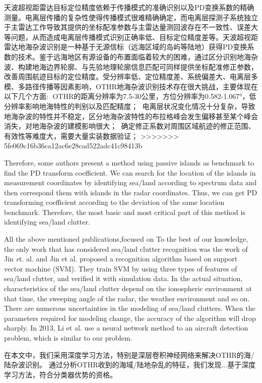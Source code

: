 天波超视距雷达目标定位精度依赖于传播模式的准确识别以及PD变换系数的精确测量。电离层传播的复杂性使得传播模式很难精确确定，而电离层探测子系统独立于主雷达工作导致其提供的坐标配准参数与主雷达量测回波存在不一致性、误差大等问题，从而造成电离层传播模式识别正确率低、目标定位精度差等。天波超视距雷达地海杂波识别是一种基于无源信标（远海区域的岛屿等陆地）获得PD变换系数的技术。鉴于远海地区有源设备的布置面临着较大的困难，通过区分识别地海杂波、构建地海边界轮廓、与先验地理轮廓信息匹配可同样提供坐标配准修正参数，改善周围航迹目标的定位精度。受分辨率低、定位精度差、系统偏差大、电离层多模、多路径传播等因素影响，OTHR地海杂波识别技术存在很大挑战，主要体现在以下几个方面:	OTHR的距离分辨率为7.5-30公里，方位分辨率为0.582-1.067°，低分辨率影响地海特性的判别以及匹配精度；	电离层状况变化情况十分复杂，导致地海杂波的特性并不稳定，区分地海杂波特性的布拉格峰会发生偏移甚至某个峰会消失，对地海杂波的建模影响很大；	确定修正系数对周围区域航迹的修正范围、有效性等难度大，需要大量实装数据验证；
>>>>>>> 5fe069c16b36ca12ac6e28cad522adc41c98413b

Therefore, some authors present a method using passive islands as benchmark to find the PD transform coefficient\cite{cuccoli2011coordinate}. We can search for the location of the islands in measurement coordinates by identifying sea/land according to spectrum data and then correspond them with islands in the radar coordinates. Thus, we can get PD transforming coefficient according to the deviation of the same location benchmark. Therefore, the most basic and most critical part of this method is identifying sea/land clutter.

All the above mentioned publications,focused on To the best of our knowledge, the only work that has considered sea/land clutter recognition was the work of Jin {\emph et. al.} \cite{jin2012svm} and Jin et al. \cite{jin2012svm} proposed a recognition algorithm based on support vector machine (SVM). They train SVM by using three types of features of sea/land clutter, and verified it with simulation data. In the actual situation, characteristics of the sea/land clutter depend on the ionospheric environment at that time, the sweeping angle of the radar, the weather environment and so on. There are numerous uncertainties in the modeling of sea/land clutters. When the parameters required for modeling change, the accuracy of the algorithm will drop sharply. In 2013, Li et al. \cite{li2013high} use a neural network method to an aircraft detection problem, which is similar to our problem.


在本文中，我们采用深度学习方法，特别是深层卷积神经网络来解决OTHR的海/陆杂波识别。 通过分析OTHR收到的海域/陆地杂乱的特征，我们发现...基于深度学习方法，符合分类器优势的资格。

